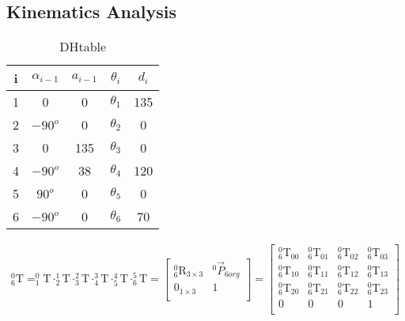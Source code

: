 \documentclass[12pt]{article}
\begin{document}
\begin{CJK}{UTF8}{bsmi}

\section{Kinematics Analysis}
\begin{table}[h]
\centering
\caption{DHtable}
\label{tab:DHtable}
\begin{tabular}{ccccc} 
\hline \hline
	i	&$\alpha _{i-1}$	&$a_{i-1}$	& $\theta _i$			&$d_i$	\\\hline
	1   &0    				&0			&$\theta _1$			&135 \\
	2   &$-90^{o}$   		&0			&$\theta _2$			&0 \\
	3   &0    				&135		&$\theta _3$ 			&0 \\
	4   &$-90^{o}$    		&38			&$\theta _4$ 			&120 \\
	5   &$90^{o}$    		&0			&$\theta _5$ 			&0 \\
	6   &$-90^{o}$    		&0			&$\theta _6$ 			&70 \\
\end{tabular}
\end{table}

\begin{equation*}
\begin{split}
^0_6\text{T} =
^0_1\text{T} \cdot ^1_2\text{T} \cdot ^2_3\text{T} \cdot ^3_4\text{T} \cdot ^4_5\text{T} \cdot ^5_6\text{T} =
\begin{bmatrix}
^0_6\text{R}_{3\times 3} 	&^0\vec{P}_{6org}\\
0_{1\times 3}				&1\\
\end{bmatrix}
=
\begin{bmatrix}
^0_6\text{T}_{00} 	&^0_6\text{T}_{01}	&^0_6\text{T}_{02}	& ^0_6\text{T}_{03}\\
^0_6\text{T}_{10} 	&^0_6\text{T}_{11}	&^0_6\text{T}_{12}	& ^0_6\text{T}_{13}\\
^0_6\text{T}_{20} 	&^0_6\text{T}_{21}	&^0_6\text{T}_{22}	& ^0_6\text{T}_{23}\\
0					&0					&0					&1\\
\end{bmatrix}
\end{split}
\end{equation*}


\end{CJK}
\end{document}
